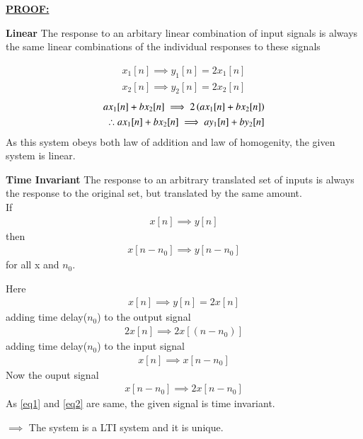 \documentclass[journal,12pt,twocolumn]{IEEEtran}
\begin{document}
\underline{\textbf{PROOF:}}
\begin{definition}{\textbf{Linear}}
The response to an arbitary linear combination of input signals is always the same linear combinations of the individual responses to these signals 
\end{definition}
\begin{align}
    x_{1}[n] \implies y_{1}[n]= 2x_{1}[n]\\
    x_{2}[n] \implies y_{2}[n]= 2x_{2}[n]
\end{align}
\begin{align}
    ax_{1}[n]+bx_{2}[n] \implies 2\left(ax_{1}[n]+bx_{2}[n]\right)\\
    \therefore ax_{1}[n]+bx_{2}[n] \implies ay_{1}[n]+by_{2}[n]
\end{align}
As this system obeys both law of addition and law of homogenity, the given system is linear.
\begin{definition}{\textbf{Time Invariant}}
The response to an arbitrary translated set of inputs is always the response to the original set, but translated by the same amount.\\
If 
\begin{align}
    x[n]\implies y[n]
\end{align}
then
\begin{align}
    x[n-n_{0}] \implies y[n-n_{0}]
\end{align} for all x and $n_{0}$.
\end{definition}
Here 
\begin{align}
    x[n]\implies y[n]=2x[n]
\end{align}
adding time delay($n_{0}$) to the output signal
\begin{align}
\label{eq1}
    2x[n]\implies 2x[(n-n_{0})]
\end{align}
adding time delay($n_{0}$) to the input signal 
\begin{align}
    x[n]\implies x[n-n_{0}]
\end{align}
Now the ouput signal 
\begin{align}
\label{eq2}
    x[n-n_{0}]\implies 2x[n-n_{0}]
\end{align}
As \ref{eq1} and \ref{eq2} are same, the given signal is time invariant. 

$\implies$ The system is a LTI system and it is unique.
\end{document}

